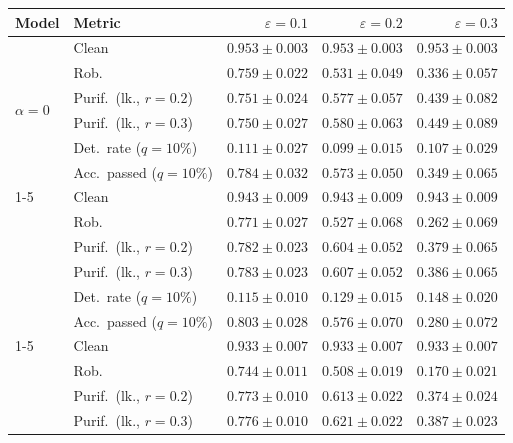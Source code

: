 \begin{table}[htbp]
  \centering
  \small
  \begin{tabular}{@{}llrrr@{}}
    \toprule
    Model & Metric & $\varepsilon=0.1$ & $\varepsilon=0.2$ & $\varepsilon=0.3$ \\
    \midrule
    \multirow{6}{*}{$\alpha{=}0$} & Clean & $\mathbf{0.953 \pm 0.003}$ & $\mathbf{0.953 \pm 0.003}$ & $\mathbf{0.953 \pm 0.003}$ \\
     & Rob. & $0.759 \pm 0.022$ & $\mathbf{0.531 \pm 0.049}$ & $\mathbf{0.336 \pm 0.057}$ \\
     & Purif.\ (lk., $r{=}0.2$) & $0.751 \pm 0.024$ & $0.577 \pm 0.057$ & $\mathbf{0.439 \pm 0.082}$ \\
     & Purif.\ (lk., $r{=}0.3$) & $0.750 \pm 0.027$ & $0.580 \pm 0.063$ & $\mathbf{0.449 \pm 0.089}$ \\
     & Det.\ rate ($q{=}10\%$) & $0.111 \pm 0.027$ & $0.099 \pm 0.015$ & $0.107 \pm 0.029$ \\
     & Acc.\ passed ($q{=}10\%$) & $0.784 \pm 0.032$ & $0.573 \pm 0.050$ & $\mathbf{0.349 \pm 0.065}$ \\
    \cmidrule(lr){1-5}
    \multirow{6}{*}{$\alpha{=}0.01$} & Clean & $0.943 \pm 0.009$ & $0.943 \pm 0.009$ & $0.943 \pm 0.009$ \\
     & Rob. & $\mathbf{0.771 \pm 0.027}$ & $0.527 \pm 0.068$ & $0.262 \pm 0.069$ \\
     & Purif.\ (lk., $r{=}0.2$) & $\mathbf{0.782 \pm 0.023}$ & $0.604 \pm 0.052$ & $0.379 \pm 0.065$ \\
     & Purif.\ (lk., $r{=}0.3$) & $\mathbf{0.783 \pm 0.023}$ & $0.607 \pm 0.052$ & $0.386 \pm 0.065$ \\
     & Det.\ rate ($q{=}10\%$) & $0.115 \pm 0.010$ & $0.129 \pm 0.015$ & $0.148 \pm 0.020$ \\
     & Acc.\ passed ($q{=}10\%$) & $\mathbf{0.803 \pm 0.028}$ & $\mathbf{0.576 \pm 0.070}$ & $0.280 \pm 0.072$ \\
    \cmidrule(lr){1-5}
    \multirow{6}{*}{$\alpha{=}0.1$} & Clean & $0.933 \pm 0.007$ & $0.933 \pm 0.007$ & $0.933 \pm 0.007$ \\
     & Rob. & $0.744 \pm 0.011$ & $0.508 \pm 0.019$ & $0.170 \pm 0.021$ \\
     & Purif.\ (lk., $r{=}0.2$) & $0.773 \pm 0.010$ & $\mathbf{0.613 \pm 0.022}$ & $0.374 \pm 0.024$ \\
     & Purif.\ (lk., $r{=}0.3$) & $0.776 \pm 0.010$ & $\mathbf{0.621 \pm 0.022}$ & $0.387 \pm 0.023$ \\

\end{tabular}
\end{table}
